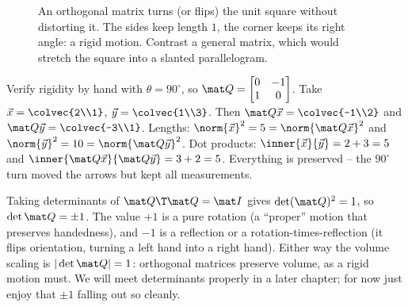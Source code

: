\begin{figure}[H]
\centering
{}
\caption{An orthogonal matrix turns (or flips) the unit square without distorting it. The sides
keep length $1$, the corner keeps its right angle: a rigid motion. Contrast a general matrix, which
would stretch the square into a slanted parallelogram.}
\label{ch17:rigid-motion}
\end{figure}

\begin{labbox}
Verify rigidity by hand with $\theta=90^\circ$, so $\mat Q=\begin{bmatrix}0&-1\\1&0\end{bmatrix}$.
Take $\vec x=\colvec{2\\1}$, $\vec y=\colvec{1\\3}$. Then $\mat Q\vec x=\colvec{-1\\2}$ and
$\mat Q\vec y=\colvec{-3\\1}$. Lengths: $\norm{\vec x}^2=5=\norm{\mat Q\vec x}^2$ and
$\norm{\vec y}^2=10=\norm{\mat Q\vec y}^2$. Dot products: $\inner{\vec x}{\vec y}=2+3=5$ and
$\inner{\mat Q\vec x}{\mat Q\vec y}=3+2=5$. Everything is preserved -- the $90^\circ$ turn moved the
arrows but kept all measurements.
\end{labbox}

\begin{remark}
Taking determinants of $\mat Q\T\mat Q=\mat I$ gives $\det(\mat Q)^2=1$, so $\det\mat Q=\pm1$.
The value $+1$ is a pure rotation (a ``proper'' motion that preserves handedness), and $-1$ is a
reflection or a rotation-times-reflection (it flips orientation, turning a left hand into a right
hand). Either way the volume scaling is $|\det\mat Q|=1$: orthogonal matrices preserve volume, as
a rigid motion must. We will meet determinants properly in a later chapter; for now just enjoy that
$\pm1$ falling out so cleanly.
\end{remark}

